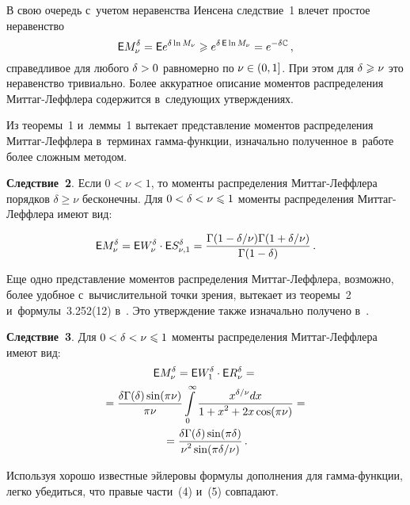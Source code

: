 \begin{multicols}{2}
\smallskip

В свою очередь с~учетом неравенства Иенсена следствие~1 влечет
простое неравенство
$$
{\sf E}M_{\nu}^{\delta}={\sf E}e^{\delta\ln M_{\nu}}\geqslant
e^{\delta\,{\sf E}\ln M_{\nu}}=e^{-\delta\mathbb{C}}\,,
$$
справедливое для любого $\delta\hm>0$ равномерно по $\nu\hm\in(0,1]$. При
этом для $\delta\hm\geqslant\nu$ это неравенство тривиально. Более аккуратное
описание моментов распределения Мит\-таг-Леф\-фле\-ра содержится 
в~следующих утверждениях.

Из теоремы~1 и~леммы~1 вытекает пред\-став\-ле\-ние моментов распределения
Мит\-таг-Леф\-фле\-ра в~терминах гам\-ма-функ\-ции, изначально полученное 
в~работе~\cite{Pillai1990} более сложным методом.

\bigskip

\noindent
\textbf{Следствие~2}. Если $0<\nu<1$, то моменты распределения
Мит\-таг-Леф\-фле\-ра порядков $\delta\geqslant\nu$ бесконечны. Для
$0\hm<\delta\hm<\nu\hm\leqslant1$ моменты распределения Мит\-таг-Леф\-фле\-ра имеют вид:

\noindent
\begin{equation}
{\sf E}M_{\nu}^{\delta}={\sf E}W_{\nu}^{\delta}\cdot{\sf
E}S_{\nu,1}^{\delta}=\displaystyle\frac{\displaystyle \Gamma(1-{\delta}/{\nu})\Gamma(1+{\delta}/{\nu})\mathstrut}{\displaystyle \Gamma(1-\delta)\mathstrut}\,.
\label{e4-kor}
\end{equation}


\smallskip

Еще одно представление моментов распределения Мит\-таг-Леф\-фле\-ра,
возможно, более удобное с~вычислительной точки зрения, вытекает из
теоремы~2 и~формулы~3.252(12) в~\cite{GradsteinRyzhik1971}. Это
утверждение также изначально получено в~\cite{Pillai1990}.

\bigskip

\noindent
\textbf{Следствие~3}. Для $0\hm<\delta\hm<\nu\hm\leqslant1$ моменты распределения
Мит\-таг-Леф\-фле\-ра имеют вид:
\begin{multline}
{\sf E}M_{\nu}^{\delta}={\sf E}W_1^{\delta}\cdot{\sf E}R_{\nu}^{\delta}={}\\
{}=
\displaystyle\frac{\displaystyle \delta\Gamma(\delta)\sin(\pi\nu)\mathstrut}{\displaystyle \pi\nu\mathstrut}
\int\limits_{0}^{\infty}\displaystyle\frac{\displaystyle x^{\delta/\nu}dx\mathstrut}{\displaystyle 1+x^{2}+2x\cos(\pi\nu)\mathstrut}={}\\
{}=
\displaystyle\frac{\displaystyle \delta\Gamma(\delta)\sin(\pi\delta)\mathstrut}{\displaystyle \nu^2\sin({\pi\delta}/{\nu})\mathstrut}\,.
\label{e5-kor}
\end{multline}

\smallskip

Используя хорошо известные эйлеровы формулы дополнения для
гам\-ма-функ\-ции, легко убедиться, что правые части~(4) и~(5)
совпадают.


\end{multicols}
